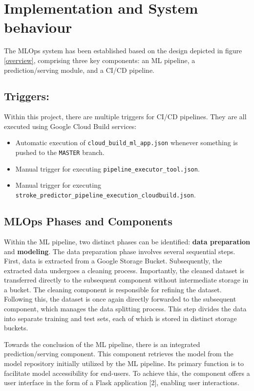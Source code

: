 

\section{Implementation and System behaviour}


The MLOps system has been established based on the design depicted in figure \ref{overview}, comprising three key components: an ML pipeline, a prediction/serving module, and a CI/CD pipeline.

\subsection{Triggers:}
Within this project, there are multiple triggers for CI/CD pipelines. They are all executed using Google Cloud Build services:

\begin{itemize}
  \item Automatic execution of \texttt{cloud\_build\_ml\_app.json} whenever something is pushed to the \texttt{MASTER} branch.
  \item Manual trigger for executing \texttt{pipeline\_executor\_tool.json}.
  \item Manual trigger for executing \texttt{stroke\_predictor\_pipeline\_execution\_cloudbuild.json}.
\end{itemize}

\subsection{MLOps Phases and Components }
Within the ML pipeline, two distinct phases can be identified: \textbf{data preparation} and \textbf{modeling}. The data preparation phase involves several sequential steps. First, data is extracted from a Google Storage Bucket. Subsequently, the extracted data undergoes a cleaning process. Importantly, the cleaned dataset is transferred directly to the subsequent component without intermediate storage in a bucket. The cleaning component is responsible for refining the dataset. Following this, the dataset is once again directly forwarded to the subsequent component, which manages the data splitting process. This step divides the data into separate training and test sets, each of which is stored in distinct storage buckets. 


Towards the conclusion of the ML pipeline, there is an integrated prediction/serving component. This component retrieves the model from the model repository initially utilized by the ML pipeline. Its primary function is to facilitate model accessibility for end-users. To achieve this, the component offers a user interface in the form of a Flask application [2], enabling user interactions.

